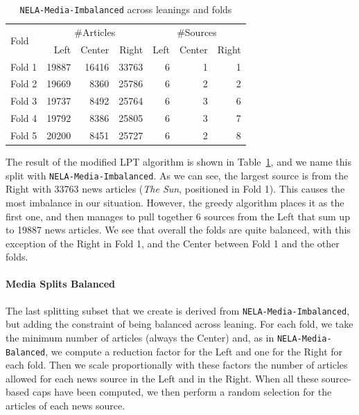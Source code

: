 \begin{table}[!htbp]
    \centering
    \begin{tabular}{l|rrr|rrr}
        \multirow{2}{*}{Fold} & \multicolumn{3}{c}{\#Articles} & \multicolumn{3}{c}{\#Sources} \\
         & Left & Center & Right & Left & Center & Right \\
        \hline
        Fold 1 & 19887 & 16416 & 33763 & 6 & 1 & 1 \\
        Fold 2 & 19669 & 8360 & 25786 & 6 & 2 & 2 \\
        Fold 3 & 19737 & 8492 & 25764 & 6 & 3 & 6 \\
        Fold 4 & 19792 & 8386 & 25805 & 6 & 3 & 7 \\
        Fold 5 & 20200 & 8451 & 25727 & 6 & 2 & 8 \\
    \end{tabular}
    \caption{\texttt{NELA-Media-Imbalanced} across leanings and folds}
    \label{tab:nela_media_imbalanced}
\end{table}

The result of the modified LPT algorithm is shown in Table~\ref{tab:nela_media_imbalanced}, and we name this split with \texttt{NELA-Media-Imbalanced}.
As we can see, the largest source is from the Right with 33763 news articles (\emph{The Sun}, positioned in Fold 1). This causes the most imbalance in our situation. However, the greedy algorithm places it as the first one, and then manages to pull together 6 sources from the Left that sum up to 19887 news articles.
We see that overall the folds are quite balanced, with this exception of the Right in Fold 1, and the Center between Fold 1 and the other folds.

\paragraph{Media Splits Balanced}

The last splitting subset that we create is derived from \texttt{NELA-Media-Imbalanced}, but adding the constraint of being balanced across leaning.
For each fold, we take the minimum number of articles (always the Center) and, as in \texttt{NELA-Media-Balanced}, we compute a reduction factor for the Left and one for the Right for each fold. Then we scale proportionally with these factors the number of articles allowed for each news source in the Left and in the Right. When all these source-based caps have been computed, we then perform a random selection for the articles of each news source.  

